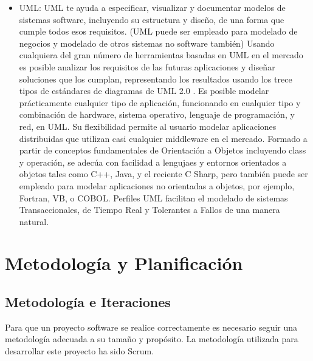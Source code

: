\documentclass[12pt, a4paper, twoside]{book}
\begin{document}
\begin{itemize}
		\item UML:
		UML te ayuda a especificar, visualizar y documentar modelos de sistemas software, incluyendo su estructura y  diseño, de una forma que cumple todos esos requisitos. (UML puede ser empleado para modelado de negocios y modelado de otros sistemas no software también) Usando cualquiera del gran número de herramientas basadas en UML en el mercado es posible analizar los requisitos de las futuras aplicaciones y diseñar soluciones que los cumplan, representando los resultados usando los trece tipos de estándares de diagramas de UML 2.0 .
		Es posible modelar prácticamente cualquier tipo de aplicación, funcionando en cualquier tipo y combinación de hardware, sistema operativo, lenguaje de programación, y red, en UML. Su flexibilidad permite al usuario modelar aplicaciones distribuidas que utilizan casi cualquier middleware en el mercado. Formado a partir de conceptos fundamentales de Orientación a Objetos incluyendo class y operación, se adecúa con facilidad a lengujaes y entornos orientados a objetos tales como C++, Java, y el reciente C Sharp, pero también puede ser empleado para modelar aplicaciones no orientadas a objetos, por ejemplo, Fortran, VB, o COBOL. Perfiles UML facilitan el modelado de sistemas Transaccionales, de Tiempo Real y Tolerantes a Fallos de una manera natural.\cite{UML}
		
	\end{itemize} 
	\chapter{Metodología y Planificación}
	\section{Metodología e Iteraciones}
	Para que un proyecto software se realice correctamente es necesario seguir una metodología adecuada a su tamaño y propósito. La metodología utilizada para desarrollar este proyecto ha sido Scrum.
\end{document}
